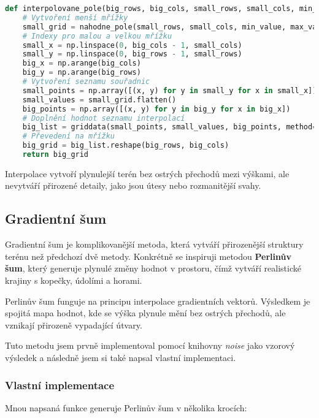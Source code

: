 \begin{lstlisting}[language=Python, caption=Kód generující iterpolovanou výškovou mapu, label=kod_interpolovane_pole]
def interpolovane_pole(big_rows, big_cols, small_rows, small_cols, min_value=0, max_value=1):
    # Vytvoření menší mřížky
    small_grid = nahodne_pole(small_rows, small_cols, min_value, max_value)
    # Indexy pro malou a velkou mřížku
    small_x = np.linspace(0, big_cols - 1, small_cols)
    small_y = np.linspace(0, big_rows - 1, small_rows)
    big_x = np.arange(big_cols)
    big_y = np.arange(big_rows)
    # Vytvoření seznamu souřadnic
    small_points = np.array([(x, y) for y in small_y for x in small_x])
    small_values = small_grid.flatten()
    big_points = np.array([(x, y) for y in big_y for x in big_x])
    # Doplnění hodnot seznamu interpolací
    big_list = griddata(small_points, small_values, big_points, method='cubic')
    # Převedení na mřížku
    big_grid = big_list.reshape(big_rows, big_cols)
    return big_grid

\end{lstlisting}

Interpolace vytvoří plynulejší terén bez ostrých přechodů mezi výškami, ale nevytváří přirozené detaily, jako jsou útesy nebo rozmanitější svahy.

\subsection{Gradientní šum}

Gradientní šum je komplikovanější metoda, která vytváří přirozenější struktury terénu než předchozí dvě metody. Konkrétně se inspiruji metodou \textbf{Perlinův šum}, který generuje plynulé změny hodnot v prostoru, čímž vytváří realistické krajiny s kopečky, údolími a horami.

Perlinův šum funguje na principu interpolace gradientních vektorů. Výsledkem je spojitá mapa hodnot, kde se výška plynule mění bez ostrých přechodů, ale vznikají přirozeně vypadající útvary. 

Tuto metodu jsem prvně implementoval pomocí knihovny \textit{noise} jako vzorový výsledek a následně jsem si také napsal vlastní implementaci.

\subsubsection{Vlastní implementace}

Mnou napsaná funkce generuje Perlinův šum v několika krocích:

